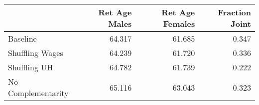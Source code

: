 \begin{tabular}{lrrr}
\toprule
{} & Ret Age Males & Ret Age Females & Fraction Joint \\
\midrule
Baseline           &        64.317 &          61.685 &          0.347 \\
Shuffling Wages    &        64.239 &          61.720 &          0.336 \\
Shuffling UH       &        64.782 &          61.739 &          0.222 \\
No Complementarity &        65.116 &          63.043 &          0.323 \\
\bottomrule
\end{tabular}
